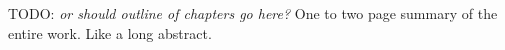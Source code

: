 \summary

TODO: \textit{or should outline of chapters go here?} One to two page summary of the entire work.  Like a long abstract.